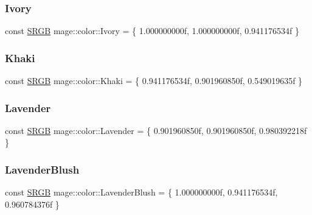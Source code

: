 \subsubsection{\texorpdfstring{Ivory}{Ivory}}
{\footnotesize\ttfamily const \hyperlink{structmage_1_1_s_r_g_b}{S\+R\+GB} mage\+::color\+::\+Ivory = \{ 1.\+000000000f, 1.\+000000000f, 0.\+941176534f \}}

\hypertarget{namespacemage_1_1color_ad82c80c9e33e2cea3ec76197619fec93}{}\label{namespacemage_1_1color_ad82c80c9e33e2cea3ec76197619fec93} 
\subsubsection{\texorpdfstring{Khaki}{Khaki}}
{\footnotesize\ttfamily const \hyperlink{structmage_1_1_s_r_g_b}{S\+R\+GB} mage\+::color\+::\+Khaki = \{ 0.\+941176534f, 0.\+901960850f, 0.\+549019635f \}}

\hypertarget{namespacemage_1_1color_ac54cc5382207fe65e9e964959d9cd534}{}\label{namespacemage_1_1color_ac54cc5382207fe65e9e964959d9cd534} 
\subsubsection{\texorpdfstring{Lavender}{Lavender}}
{\footnotesize\ttfamily const \hyperlink{structmage_1_1_s_r_g_b}{S\+R\+GB} mage\+::color\+::\+Lavender = \{ 0.\+901960850f, 0.\+901960850f, 0.\+980392218f \}}

\hypertarget{namespacemage_1_1color_a55f528361edc185bbbe8b56bfe81a23c}{}\label{namespacemage_1_1color_a55f528361edc185bbbe8b56bfe81a23c} 
\subsubsection{\texorpdfstring{Lavender\+Blush}{LavenderBlush}}
{\footnotesize\ttfamily const \hyperlink{structmage_1_1_s_r_g_b}{S\+R\+GB} mage\+::color\+::\+Lavender\+Blush = \{ 1.\+000000000f, 0.\+941176534f, 0.\+960784376f \}}

\hypertarget{namespacemage_1_1color_a44535b99e4687fb198362191ed65195c}{}\label{namespacemage_1_1color_a44535b99e4687fb198362191ed65195c} 
